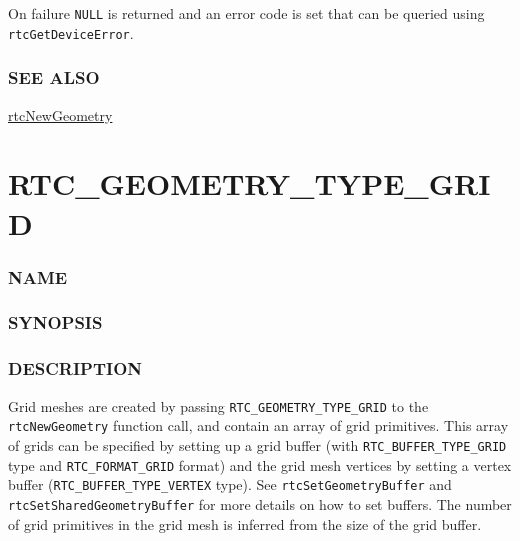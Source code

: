 On failure \texttt{NULL} is returned and an error code is set that can
be queried using \texttt{rtcGetDeviceError}.

\subsubsection{SEE ALSO}\label{see-also}

\hyperref[rtcnewgeometry]{rtcNewGeometry}

\pagebreak

\section{RTC\_GEOMETRY\_TYPE\_GRID}\label{rtc_geometry_type_grid}

\subsubsection{NAME}\label{name}

\begin{Shaded}
\begin{Highlighting}[]
\OperatorTok{{-}}
\end{Highlighting}
\end{Shaded}

\subsubsection{SYNOPSIS}\label{synopsis}

\begin{Shaded}
\begin{Highlighting}[]

\OperatorTok{=}
\OperatorTok{(}\OperatorTok{,}\OperatorTok{);}
\end{Highlighting}
\end{Shaded}

\subsubsection{DESCRIPTION}\label{description}

Grid meshes are created by passing \texttt{RTC\_GEOMETRY\_TYPE\_GRID} to
the \texttt{rtcNewGeometry} function call, and contain an array of grid
primitives. This array of grids can be specified by setting up a grid
buffer (with \texttt{RTC\_BUFFER\_TYPE\_GRID} type and
\texttt{RTC\_FORMAT\_GRID} format) and the grid mesh vertices by setting
a vertex buffer (\texttt{RTC\_BUFFER\_TYPE\_VERTEX} type). See
\texttt{rtcSetGeometryBuffer} and \texttt{rtcSetSharedGeometryBuffer}
for more details on how to set buffers. The number of grid primitives in
the grid mesh is inferred from the size of the grid buffer.

